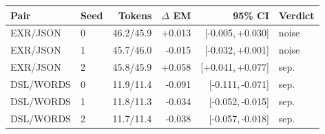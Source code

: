 \begin{tabular}{llrrrl}
\toprule
Pair & Seed & Tokens & $\Delta$ EM & 95\% CI & Verdict \\
\midrule
EXR/JSON & 0 & 46.2/45.9 & +0.013 & [-0.005,\,+0.030] & noise \\
EXR/JSON & 1 & 45.7/46.0 & -0.015 & [-0.032,\,+0.001] & noise \\
EXR/JSON & 2 & 45.8/45.9 & +0.058 & [+0.041,\,+0.077] & sep. \\
DSL/WORDS & 0 & 11.9/11.4 & -0.091 & [-0.111,\,-0.071] & sep. \\
DSL/WORDS & 1 & 11.8/11.3 & -0.034 & [-0.052,\,-0.015] & sep. \\
DSL/WORDS & 2 & 11.7/11.4 & -0.038 & [-0.057,\,-0.018] & sep. \\
\bottomrule
\end{tabular}

